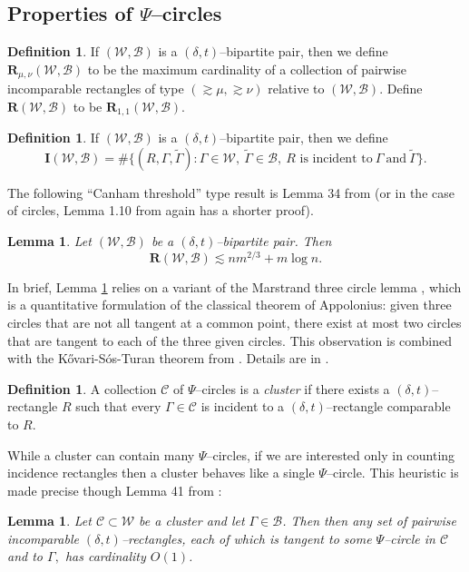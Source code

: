 \documentclass[reqno]{amsart}
\newtheorem{lem}[thm]{Lemma}
\theoremstyle{definition}
\newtheorem{defn}[thm]{Definition}
\theoremstyle{remark}
\theoremstyle{remark}
\newcommand{\incidences}{\mathbf I}
\newcommand{\dt}{(\delta,t)}
\newcommand{\WC}{\mathcal W}
\newcommand{\BC}{\mathcal B}
\newcommand{\WB}{(\mathcal W,\mathcal B)}
\newcommand{\rect}{\mathbf{R}}
\begin{document}
\subsection{Properties of $\Psi$--circles}
\begin{defn}
If $\WB$ is a $\dt$--bipartite pair, then we define $\rect_{\mu,\nu}(\WC,\BC)$ to be the maximum cardinality of a collection of pairwise incomparable rectangles of type $(\gtrsim\mu,\gtrsim\nu)$ relative to $\WB$. Define $\rect(\WC,\BC)$ to be $\rect_{1,1}(\WC,\BC)$.
\end{defn}
\begin{defn}
If $\WB$ is a $\dt$--bipartite pair, then we define
\begin{equation*}
\incidences(\WC,\BC)=\#\{(R,\Gamma,\tilde\Gamma)\colon \Gamma\in\WC,\ \tilde\Gamma\in\BC,\ \textrm{$R$ is incident to}\ \Gamma\ \textrm{and}\ \tilde\Gamma\}.
\end{equation*}
\end{defn}

The following ``Canham threshold'' type result is Lemma 34 from \cite{Zahl} (or in the case of circles, Lemma 1.10 from \cite{Wolff4} again has a shorter proof).
\begin{lem}\label{canhamLem}
Let $\WB$ be a $\dt$--bipartite pair. Then
\begin{equation}\label{CanhamThreshhold}
\rect \WB\lesssim nm^{2/3}+m\log n.
\end{equation}
\end{lem}
In brief, Lemma \ref{canhamLem} relies on a variant of the Marstrand three circle lemma \cite{Marstrand}, which is a quantitative formulation of the classical theorem of Appolonius: given three circles that are not all tangent at a common point, there exist at most two circles that are tangent to each of the three given circles. This observation is combined with the K\H{o}vari-S\'os-Turan theorem from \cite{Turan}. Details are in \cite{Zahl}.
\begin{defn}
A collection $\mathcal C$ of $\Psi$--circles is a \emph{cluster} if there exists a $\dt$--rectangle $R$ such that every $\Gamma\in\mathcal C$ is incident to a $\dt$--rectangle comparable to $R$.
\end{defn}
While a cluster can contain many $\Psi$--circles, if we are interested only in counting incidence rectangles then a cluster behaves like a single $\Psi$--circle. This heuristic is made precise though Lemma 41 from \cite{Zahl}:
\begin{lem}\label{lem41}
Let $\mathcal C \subset \mathcal W$ be a cluster and let $\Gamma\in\mathcal B$. Then then any set of pairwise incomparable $\dt$--rectangles, each of which is tangent to some $\Psi$--circle in $\mathcal C$ and to $\Gamma,$ has cardinality $O(1)$.
\end{lem}
\end{document}
